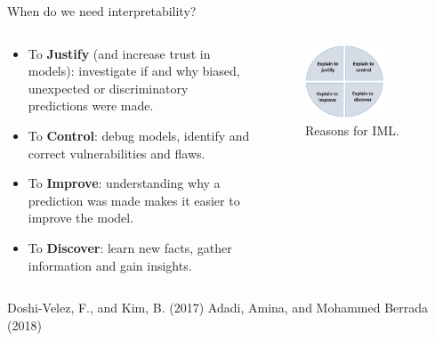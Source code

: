 \documentclass[11pt,compress,t,notes=noshow, xcolor=table]{beamer}
\begin{document}
\begin{vbframe}{When do we need interpretability?}
\begin{columns}
\begin{column}{0.6\textwidth}
\begin{itemize}
  \item To \textbf{Justify} (and increase trust in models): investigate if and why biased, unexpected or discriminatory predictions were made.
  \item To \textbf{Control}: debug models, identify and correct vulnerabilities and flaws.
  \item To \textbf{Improve}: understanding why a prediction was made makes it easier to improve the model.
  \item To \textbf{Discover}: learn new facts, gather information and gain insights.
\end{itemize}
\end{column}
\begin{column}{0.6\textwidth}  %
 \vspace{0.5cm}
 \begin{center}
 \begin{figure}
  \includegraphics[width=0.7\textwidth]{figure_man/explain-to}
  \caption{Reasons for IML.}
 \end{figure}
 \end{center}
\end{column}
\end{columns}
 \lz
\tiny{Doshi-Velez, F., and Kim, B. (2017)}
\tiny{Adadi, Amina, and Mohammed Berrada (2018)}
\end{vbframe}
\end{document}

